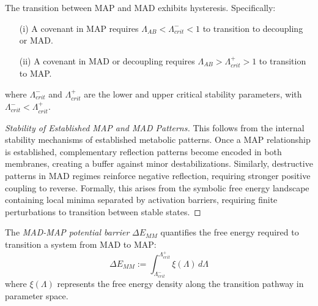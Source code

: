 \begin{corollary} \label{corollary:bk5_reflective_hysteresis} 
The transition between MAP and MAD exhibits hysteresis. Specifically:
\begin{enumerate}
  \item[(i)] A covenant in MAP requires $\Lambda_{AB} < \Lambda_{crit}^- < 1$ to transition to decoupling or MAD.
  \item[(ii)] A covenant in MAD or decoupling requires $\Lambda_{AB} > \Lambda_{crit}^+ > 1$ to transition to MAP.
\end{enumerate}
\noindent where $\Lambda_{crit}^-$ and $\Lambda_{crit}^+$ are the lower and upper critical stability parameters, with $\Lambda_{crit}^- < \Lambda_{crit}^+$.
\end{corollary}
\begin{proof}[Stability of Established MAP and MAD Patterns]
\label{proof:bk5_stability_map_mad_patterns}
This follows from the internal stability mechanisms of established metabolic patterns. Once a MAP relationship is established, complementary reflection patterns become encoded in both membranes, creating a buffer against minor destabilizations. Similarly, destructive patterns in MAD regimes reinforce negative reflection, requiring stronger positive coupling to reverse.
Formally, this arises from the symbolic free energy landscape containing local minima separated by activation barriers, requiring finite perturbations to transition between stable states.
\end{proof}
\begin{definition} \label{definition:bk5_mad_map_potential_barrie} 

The \emph{MAD-MAP potential barrier} $\Delta E_{MM}$ quantifies the free energy required to transition a system from MAD to MAP:
\begin{equation}
\Delta E_{MM} := \int_{\Lambda_{crit}^-}^{\Lambda_{crit}^+} \xi(\Lambda) \, d\Lambda
\end{equation}
\noindent where $\xi(\Lambda)$ represents the free energy density along the transition pathway in parameter space.
\end{definition}
